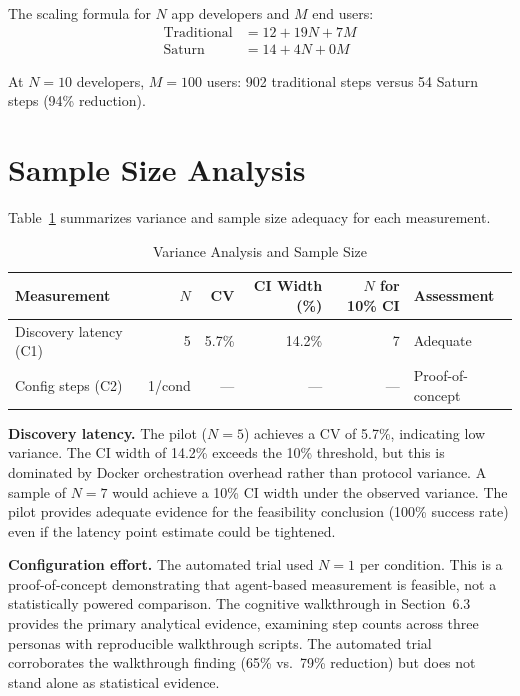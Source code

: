The scaling formula for $N$ app developers and $M$ end users:
\begin{align*}
\text{Traditional} &= 12 + 19N + 7M \\
\text{Saturn} &= 14 + 4N + 0M
\end{align*}

At $N=10$ developers, $M=100$ users: 902 traditional steps versus 54 Saturn steps (94\% reduction).

\section{Sample Size Analysis}

Table~\ref{tab:sample-size} summarizes variance and sample size adequacy for each measurement.

\begin{table}[ht]
\centering
\caption{Variance Analysis and Sample Size}
\label{tab:sample-size}
\begin{tabular}{l r r r r l}
\hline
\textbf{Measurement} & \textbf{$N$} & \textbf{CV} & \textbf{CI Width (\%)} & \textbf{$N$ for 10\% CI} & \textbf{Assessment} \\
\hline
Discovery latency (C1) & 5 & 5.7\% & 14.2\% & 7 & Adequate \\
Config steps (C2) & 1/cond & --- & --- & --- & Proof-of-concept \\
\hline
\end{tabular}
\end{table}

\textbf{Discovery latency.} The pilot ($N=5$) achieves a CV of 5.7\%, indicating low variance. The CI width of 14.2\% exceeds the 10\% threshold, but this is dominated by Docker orchestration overhead rather than protocol variance. A sample of $N=7$ would achieve a 10\% CI width under the observed variance. The pilot provides adequate evidence for the feasibility conclusion (100\% success rate) even if the latency point estimate could be tightened.

\textbf{Configuration effort.} The automated trial used $N=1$ per condition. This is a proof-of-concept demonstrating that agent-based measurement is feasible, not a statistically powered comparison. The cognitive walkthrough in Section~6.3 provides the primary analytical evidence, examining step counts across three personas with reproducible walkthrough scripts. The automated trial corroborates the walkthrough finding (65\% vs.\ 79\% reduction) but does not stand alone as statistical evidence.


